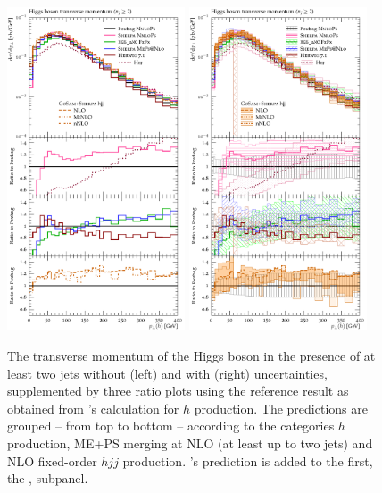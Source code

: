 \begin{figure}[t!]
  \centering
  \includegraphics[width=0.47\textwidth]{figures/hjetscomp_u_H_jj_pT_incl.pdf}
  \hfill
  \includegraphics[width=0.47\textwidth]{figures/hjetscomp_H_jj_pT_incl.pdf}
  \caption{\label{fig:hjetscomp:results:2obs:hpt_j2pt}%
    The transverse momentum of the Higgs boson in the presence of at
    least two jets without (left) and with (right) uncertainties,
    supplemented by three ratio plots using the reference result as
    obtained from \Powheg's \NNLOPS calculation for $h$ production.
    The predictions are grouped -- from top to bottom -- according to
    the categories \NNLOPS $h$ production, ME+PS merging at NLO (at
    least up to two jets) and NLO fixed-order $hjj$ production. \Hej's
    prediction is added to the first, the \NNLOPS, subpanel.}
\end{figure}

